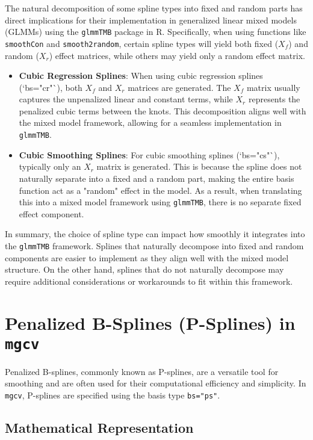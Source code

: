 \documentclass{article}
\begin{document}
The natural decomposition of some spline types into fixed and random parts has direct implications for their implementation in generalized linear mixed models (GLMMs) using the \texttt{glmmTMB} package in R. Specifically, when using functions like \texttt{smoothCon} and \texttt{smooth2random}, certain spline types will yield both fixed (\(X_f\)) and random (\(X_r\)) effect matrices, while others may yield only a random effect matrix.

\begin{itemize}
    \item \textbf{Cubic Regression Splines}: When using cubic regression splines (`bs="cr"`), both \(X_f\) and \(X_r\) matrices are generated. The \(X_f\) matrix usually captures the unpenalized linear and constant terms, while \(X_r\) represents the penalized cubic terms between the knots. This decomposition aligns well with the mixed model framework, allowing for a seamless implementation in \texttt{glmmTMB}.
    
    \item \textbf{Cubic Smoothing Splines}: For cubic smoothing splines (`bs="cs"`), typically only an \(X_r\) matrix is generated. This is because the spline does not naturally separate into a fixed and a random part, making the entire basis function act as a "random" effect in the model. As a result, when translating this into a mixed model framework using \texttt{glmmTMB}, there is no separate fixed effect component.
\end{itemize}

In summary, the choice of spline type can impact how smoothly it integrates into the \texttt{glmmTMB} framework. Splines that naturally decompose into fixed and random components are easier to implement as they align well with the mixed model structure. On the other hand, splines that do not naturally decompose may require additional considerations or workarounds to fit within this framework.


\section{Penalized B-Splines (P-Splines) in \texttt{mgcv}}

Penalized B-splines, commonly known as P-splines, are a versatile tool for smoothing and are often used for their computational efficiency and simplicity. In \texttt{mgcv}, P-splines are specified using the basis type \texttt{bs="ps"}.

\subsection{Mathematical Representation}
\end{document}
